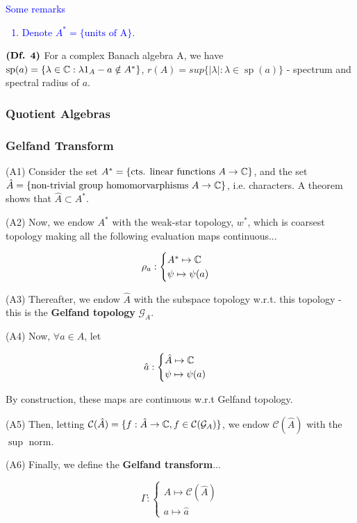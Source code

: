 \documentclass{article}
\DeclareMathOperator{\spec}{sp}
\begin{document}
\textcolor{blue}{Some remarks}
\textcolor{blue}{\begin{enumerate}
    \item Denote $A^* = \{\text{units of A}\}$.
\end{enumerate}}

$\textbf{(Df. 4)}$ For a complex Banach algebra A, we have $\spec(a) = \{ \lambda \in \C : \lambda 1_A - a  \notin A^* \}$, $r(A) = sup\{|\lambda| : \lambda \in \spec(a) \}$ - spectrum and spectral radius of $a$.

\subsubsection{Quotient Algebras}

\subsubsection{Gelfand Transform}
(A1) Consider the set $A^* = \{ \text{cts. linear functions $A \rightarrow \mathbb{C}$} \}$, and the set $\hat{A} = \{ \text{non-trivial group homomorvarphisms $A \rightarrow \mathbb{C}$}\}$, i.e. characters. A theorem shows that $\hat{A} \subset A^*$. 

(A2) Now, we endow $A^*$ with the weak-star topology, $w^*$, which is coarsest topology making all the following evaluation maps continuous...

$$\rho_a:\begin{cases}
A^* \mapsto \mathbb{C} \\
\psi \mapsto \psi(a)
\end{cases}$$

(A3) Thereafter, we endow $\hat{A}$ with the subspace topology w.r.t. this topology - this is the \textbf{Gelfand topology} $\mathcal{G}_A$.

(A4) Now, $\forall a \in A$, let 

$$\hat{a}:\begin{cases}
\hat{A} \mapsto \mathbb{C} \\
\psi \mapsto \psi(a)
\end{cases}$$

By construction, these maps are continuous w.r.t Gelfand topology.

(A5) Then, letting $\mathcal{C}(\hat{A}) = \{ f: \hat{A} \rightarrow \mathbb{C}, f \in \mathcal{C}(\mathcal{G}_A) \}$, we endow $\mathcal{C}(\hat{A})$ with the $\sup$ norm. 

(A6) Finally, we define the \textbf{Gelfand transform}...

$$\Gamma:\begin{cases}
A \mapsto \mathcal{C}(\hat{A}) \\
a \mapsto \hat{a}
\end{cases}$$
\end{document}
